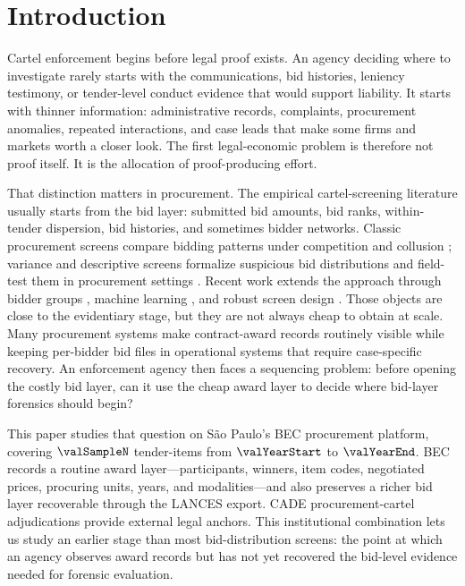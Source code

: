\section{Introduction}
\label{sec:intro}

Cartel enforcement begins before legal proof exists. An
agency deciding where to investigate rarely starts with the
communications, bid histories, leniency testimony, or
tender-level conduct evidence that would support liability.
It starts with thinner information: administrative records,
complaints, procurement anomalies, repeated interactions, and
case leads that make some firms and markets worth a closer
look. The first legal-economic problem is therefore not proof
itself. It is the allocation of proof-producing effort.

That distinction matters in procurement. The empirical
cartel-screening literature usually starts from the bid layer:
submitted bid amounts, bid ranks, within-tender dispersion,
bid histories, and sometimes bidder networks. Classic
procurement screens compare bidding patterns under competition
and collusion \citep{porter1993detection,bajari2003deciding};
variance and descriptive screens formalize suspicious bid
distributions \citep{abrantesmetz2006a,harrington2008detecting}
and field-test them in procurement settings
\citep{imhof2018screening,imhof2019detecting}. Recent work
extends the approach through bidder groups
\citep{conley2016detecting}, machine learning
\citep{huber2019machine,wallimann2023machine}, and robust
screen design \citep{chassang2022robust}.
Those objects are close to the evidentiary stage, but they are
not always cheap to obtain at scale. Many procurement systems
make contract-award records routinely visible while keeping
per-bidder bid files in operational systems that require
case-specific recovery. An enforcement agency then faces a
sequencing problem: before opening the costly bid layer, can it
use the cheap award layer to decide where bid-layer forensics
should begin?

This paper studies that question on S\~ao Paulo's BEC
procurement platform, covering $\valSampleN$ tender-items from
$\valYearStart$ to $\valYearEnd$. BEC records a routine
award layer---participants, winners, item codes, negotiated
prices, procuring units, years, and modalities---and also
preserves a richer bid layer recoverable through the LANCES
export. CADE procurement-cartel adjudications provide external
legal anchors. This institutional combination lets us study an
earlier stage than most bid-distribution screens: the point at
which an agency observes award records but has not yet recovered
the bid-level evidence needed for forensic evaluation.

